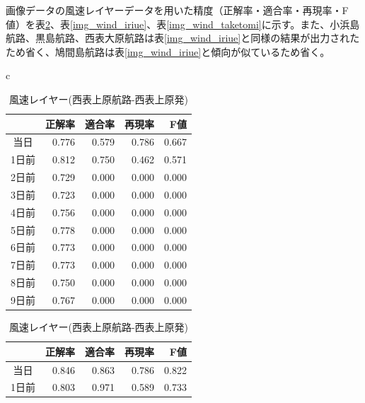 画像データの風速レイヤーデータを用いた精度（正解率・適合率・再現率・F値）を表\ref{img_wind_hateruma}、表\ref{img_wind_iriue}、表\ref{img_wind_taketomi}に示す。また、小浜島航路、黒島航路、西表大原航路は表\ref{img_wind_iriue}と同様の結果が出力されたため省く、鳩間島航路は表\ref{img_wind_iriue}と傾向が似ているため省く。

\begin{table}[htbp]
  \begin{center}
    \begin{tabular}{c}
      \begin{minipage}{0.5\hsize}
        \begin{center}
          \caption{風速レイヤー(波照間航路-波照発)}
          \begin{tabular}{|c|r|r|r|r|} \hline
   &正解率 & 適合率 & 再現率 & F値 \\ \hline
      当日&0.776 &0.579 &0.786 &0.667 \\ \hline
     1日前 & 0.812 & 0.750 & 0.462 & 0.571 \\ \hline
      2日前 & 0.729 & 0.000 & 0.000 & 0.000 \\ \hline
      3日前 & 0.723 & 0.000 & 0.000 & 0.000 \\ \hline 
      4日前 & 0.756 & 0.000 & 0.000 & 0.000 \\ \hline 
      5日前 & 0.778 & 0.000 & 0.000 & 0.000 \\ \hline 
      6日前 & 0.773 & 0.000 & 0.000 & 0.000 \\ \hline 
      7日前 & 0.773 & 0.000 & 0.000 & 0.000 \\ \hline 
      8日前 & 0.750 & 0.000 & 0.000 & 0.000 \\ \hline 
      9日前 & 0.767 & 0.000 & 0.000 & 0.000 \\ \hline 
          \end{tabular}
          \label{img_wind_hateruma}
        \end{center}
      \end{minipage}
      \begin{minipage}{0.5\hsize}
        \begin{center}
          \caption{風速レイヤー(西表上原航路-西表上原発)}
    \begin{tabular}{|c|r|r|r|r|} \hline
   &正解率 & 適合率 & 再現率 & F値 \\ \hline
      当日 & 0.846 & 0.863 & 0.786 & 0.822 \\ \hline
     1日前 & 0.803 & 0.971 & 0.589 & 0.733 \\ \hline

\end{tabular}
\end{center}
\end{minipage}
\end{tabular}
\end{center}
\end{table}
